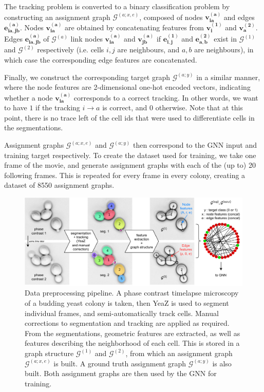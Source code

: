 \documentclass[10pt,conference,compsocconf,a4paper]{IEEEtran}
\newcommand{\G}{\mathcal{G}}
\renewcommand{\vec}[1]{\boldsymbol{#1}}
\begin{document}
		The tracking problem is converted to a binary classification problem by constructing an assignment graph $\G^{(a;x,e)}$, composed of nodes $\vec{v_{ia}^{(a)}}$ and edges $\vec{e_{ia,jb}^{(a)}}$.
		Nodes $\vec{v_{ia}^{(a)}}$ are obtained by concatenating features from $\vec{v_i^{(1)}}$ and $\vec{v_a^{(2)}}$. Edges $\vec{e_{ia,jb}^{(a)}}$ of $\G^{(a)}$ link nodes $\vec{v_{ia}^{(a)}}$ and $\vec{v_{jb}^{(a)}}$ if $\vec{e_{i,j}^{(1)}}$ and $\vec{e_{a,b}^{(2)}}$ exist in $\G^{(1)}$ and $\G^{(2)}$ respectively (i.e. cells $i,j$ are neighbours, and $a,b$ are neighbours), in which case the corresponding edge features are concatenated.

		Finally, we construct the corresponding target graph $\G^{(a;y)}$ in a similar manner, where the node features are 2-dimensional one-hot encoded vectors, indicating whether a node $\vec{v_{ia}^{(a)}}$ corresponds to a correct tracking. In other words, we want to have $1$ if the tracking $i \rightarrow a$ is correct, and $0$ otherwise. Note that at this point, there is no trace left of the cell ids that were used to differentiate cells in the segmentations.

		Assignment graphs $\G^{(a;x,e)}$ and $\G^{(a;y)}$ then correspond to the GNN input and training target respectively.
		To create the dataset used for training, we take one frame of the movie, and generate assignment graphs with each of the (up to) 20 following frames. This is repeated for every frame in every colony, creating a dataset of 8550 assignment graphs.

		\begin{figure}
			\centering
			\includegraphics[width=\linewidth]{figures/pipeline.v2.pdf}
			\caption{Data preprocessing pipeline. A phase contrast timelapse microscopy of a budding yeast colony is taken, then YeaZ \cite{dietler_convolutional_2020} is used to segment individual frames, and semi-automatically track cells. Manual corrections to segmentation and tracking are applied as required. From the segmentations, geometric features are extracted, as well as features describing the neighborhood of each cell. This is stored in a graph structure $\G^{(1)}$ and $\G^{(2)}$, from which an assignment graph $\G^{(a;x,e)}$ is built. A ground truth assignment graph $\G^{(a;y)}$ is also built. Both assignment graphs are then used by the GNN for training.}
			\label{fig:pipeline}
		\end{figure}
\end{document}
